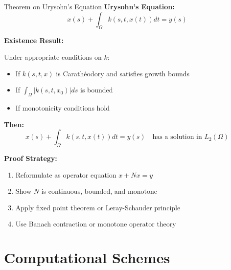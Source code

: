 \documentclass[aspectratio=169,10pt]{beamer}
\theoremstyle{plain}
\theoremstyle{definition}
\begin{document}
\begin{frame}[fragile]{Theorem on Urysohn's Equation}
  \textbf{Urysohn's Equation:}
  \[
    x(s) + \int_{\Omega} k(s, t, x(t)) dt = y(s)
  \]

  \vspace{0.3cm}
  \textbf{Existence Result:}

  Under appropriate conditions on $k$:
  \begin{itemize}
    \item If $k(s,t,x)$ is Carathéodory and satisfies growth bounds
    \item If $\int_{\Omega} |k(s,t,x_0)| ds$ is bounded
    \item If monotonicity conditions hold
  \end{itemize}

  \vspace{0.2cm}
  \textbf{Then:}
  \[
    x(s) + \int_{\Omega} k(s, t, x(t)) dt = y(s) \quad \text{has a solution in } L_2(\Omega)
  \]

  \vspace{0.3cm}
  \textbf{Proof Strategy:}
  \begin{enumerate}
    \item Reformulate as operator equation $x + Nx = y$
    \item Show $N$ is continuous, bounded, and monotone
    \item Apply fixed point theorem or Leray-Schauder principle
    \item Use Banach contraction or monotone operator theory
  \end{enumerate}
\end{frame}

\section{Computational Schemes}
\end{document}
